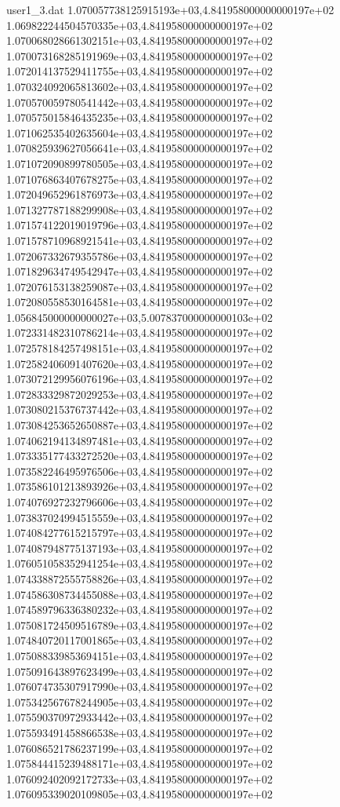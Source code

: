 \begin{filecontents}{user1_3.dat}
1.070057738125915193e+03,4.841958000000000197e+02
1.069822244504570335e+03,4.841958000000000197e+02
1.070068028661302151e+03,4.841958000000000197e+02
1.070073168285191969e+03,4.841958000000000197e+02
1.072014137529411755e+03,4.841958000000000197e+02
1.070324092065813602e+03,4.841958000000000197e+02
1.070570059780541442e+03,4.841958000000000197e+02
1.070575015846435235e+03,4.841958000000000197e+02
1.071062535402635604e+03,4.841958000000000197e+02
1.070825939627056641e+03,4.841958000000000197e+02
1.071072090899780505e+03,4.841958000000000197e+02
1.071076863407678275e+03,4.841958000000000197e+02
1.072049652961876973e+03,4.841958000000000197e+02
1.071327787188299908e+03,4.841958000000000197e+02
1.071574122019019796e+03,4.841958000000000197e+02
1.071578710968921541e+03,4.841958000000000197e+02
1.072067332679355786e+03,4.841958000000000197e+02
1.071829634749542947e+03,4.841958000000000197e+02
1.072076153138259087e+03,4.841958000000000197e+02
1.072080558530164581e+03,4.841958000000000197e+02
1.056845000000000027e+03,5.007837000000000103e+02
1.072331482310786214e+03,4.841958000000000197e+02
1.072578184257498151e+03,4.841958000000000197e+02
1.072582406091407620e+03,4.841958000000000197e+02
1.073072129956076196e+03,4.841958000000000197e+02
1.072833329872029253e+03,4.841958000000000197e+02
1.073080215376737442e+03,4.841958000000000197e+02
1.073084253652650887e+03,4.841958000000000197e+02
1.074062194134897481e+03,4.841958000000000197e+02
1.073335177433272520e+03,4.841958000000000197e+02
1.073582246495976506e+03,4.841958000000000197e+02
1.073586101213893926e+03,4.841958000000000197e+02
1.074076927232796606e+03,4.841958000000000197e+02
1.073837024994515559e+03,4.841958000000000197e+02
1.074084277615215797e+03,4.841958000000000197e+02
1.074087948775137193e+03,4.841958000000000197e+02
1.076051058352941254e+03,4.841958000000000197e+02
1.074338872555758826e+03,4.841958000000000197e+02
1.074586308734455088e+03,4.841958000000000197e+02
1.074589796336380232e+03,4.841958000000000197e+02
1.075081724509516789e+03,4.841958000000000197e+02
1.074840720117001865e+03,4.841958000000000197e+02
1.075088339853694151e+03,4.841958000000000197e+02
1.075091643897623499e+03,4.841958000000000197e+02
1.076074735307917990e+03,4.841958000000000197e+02
1.075342567678244905e+03,4.841958000000000197e+02
1.075590370972933442e+03,4.841958000000000197e+02
1.075593491458866538e+03,4.841958000000000197e+02
1.076086521786237199e+03,4.841958000000000197e+02
1.075844415239488171e+03,4.841958000000000197e+02
1.076092402092172733e+03,4.841958000000000197e+02
1.076095339020109805e+03,4.841958000000000197e+02

\end{filecontents}
